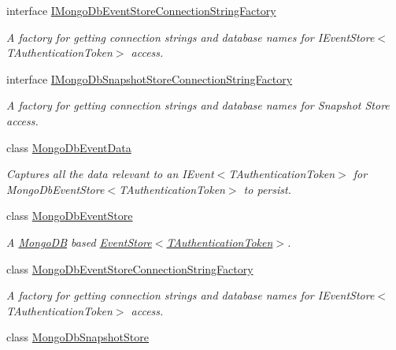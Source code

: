 \begin{DoxyCompactItemize}
\item 
interface \hyperlink{interfaceCqrs_1_1MongoDB_1_1Events_1_1IMongoDbEventStoreConnectionStringFactory}{I\+Mongo\+Db\+Event\+Store\+Connection\+String\+Factory}
\begin{DoxyCompactList}\small\item\em A factory for getting connection strings and database names for I\+Event\+Store$<$\+T\+Authentication\+Token$>$ access. \end{DoxyCompactList}\item 
interface \hyperlink{interfaceCqrs_1_1MongoDB_1_1Events_1_1IMongoDbSnapshotStoreConnectionStringFactory}{I\+Mongo\+Db\+Snapshot\+Store\+Connection\+String\+Factory}
\begin{DoxyCompactList}\small\item\em A factory for getting connection strings and database names for Snapshot Store access. \end{DoxyCompactList}\item 
class \hyperlink{classCqrs_1_1MongoDB_1_1Events_1_1MongoDbEventData}{Mongo\+Db\+Event\+Data}
\begin{DoxyCompactList}\small\item\em Captures all the data relevant to an I\+Event$<$\+T\+Authentication\+Token$>$ for Mongo\+Db\+Event\+Store$<$\+T\+Authentication\+Token$>$ to persist. \end{DoxyCompactList}\item 
class \hyperlink{classCqrs_1_1MongoDB_1_1Events_1_1MongoDbEventStore}{Mongo\+Db\+Event\+Store}
\begin{DoxyCompactList}\small\item\em A \hyperlink{namespaceCqrs_1_1MongoDB}{Mongo\+DB} based \hyperlink{classCqrs_1_1Events_1_1EventStore_a6346cb2aea4c5b4e740dc6cfb15abab8_a6346cb2aea4c5b4e740dc6cfb15abab8}{Event\+Store$<$\+T\+Authentication\+Token$>$}. \end{DoxyCompactList}\item 
class \hyperlink{classCqrs_1_1MongoDB_1_1Events_1_1MongoDbEventStoreConnectionStringFactory}{Mongo\+Db\+Event\+Store\+Connection\+String\+Factory}
\begin{DoxyCompactList}\small\item\em A factory for getting connection strings and database names for I\+Event\+Store$<$\+T\+Authentication\+Token$>$ access. \end{DoxyCompactList}\item 
class \hyperlink{classCqrs_1_1MongoDB_1_1Events_1_1MongoDbSnapshotStore}{Mongo\+Db\+Snapshot\+Store}

\end{DoxyCompactItemize}
